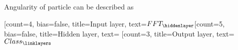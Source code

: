 Angularity of particle can be described as 

\begin{neuralnetwork}[height=4]
		\newcommand{\nodetextclear}[2]{}
		\newcommand{\nodetextx}[2]{$FFT_#2$}
		\newcommand{\nodetexty}[2]{$Class_#2$}
		[count=4, bias=false, title=Input layer, text=\nodetextx]
		\hiddenlayer[count=5, bias=false, title=Hidden layer, text=\nodetextclear] \linklayers
		\outputlayer[count=3, title=Output layer, text=\nodetexty] \linklayers
\end{neuralnetwork}